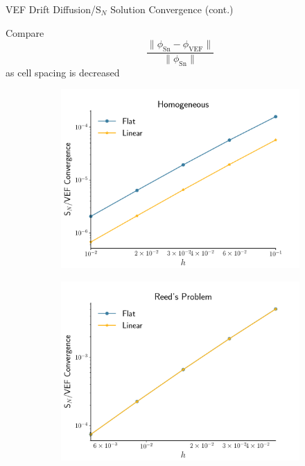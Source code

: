 \documentclass[10pt]{beamer}
\newcommand{\SN}{S$_N$\xspace}
\begin{document}
\begin{frame}{VEF Drift Diffusion/\SN Solution Convergence (cont.)}

	Compare 
		\begin{equation*}
			\frac{\|\phi_\text{Sn} - \phi_\text{VEF}\|}{\| \phi_\text{Sn}\|}
		\end{equation*}
	as cell spacing is decreased 

	\begin{figure}[htb]
		\centering
		\begin{subfigure}{.5\textwidth}
			\centering
			\includegraphics[width=\textwidth]{figs/solconv_homo.pdf}
			\label{fig:homo}
		\end{subfigure}
		\hspace{-2em}
		\begin{subfigure}{.5\textwidth}
			\centering
			\includegraphics[width=\textwidth]{figs/solconv_reed.pdf}
			\label{fig:reed}
		\end{subfigure}
	\end{figure}


\end{frame}
\end{document}
